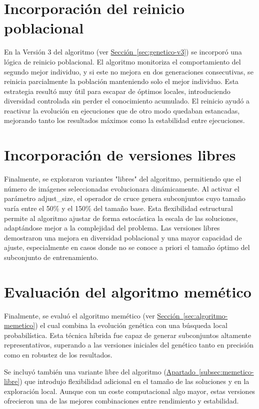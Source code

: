 \section{Incorporación del reinicio poblacional}\label{sec:incorporacion-reinicio-poblacional}
En la Versión 3 del algoritmo (ver \hyperref[sec:genetico-v3]{Sección~\ref*{sec:genetico-v3}}) se incorporó una lógica de reinicio poblacional.
El algoritmo monitoriza el comportamiento del segundo mejor individuo, y si este no mejora en dos generaciones consecutivas, se reinicia parcialmente la población manteniendo solo el mejor individuo.
Esta estrategia resultó muy útil para escapar de óptimos locales, introduciendo diversidad controlada sin perder el conocimiento acumulado.
El reinicio ayudó a reactivar la evolución en ejecuciones que de otro modo quedaban estancadas, mejorando tanto los resultados máximos como la estabilidad entre ejecuciones.

\section{Incorporación de versiones libres}\label{sec:incorporacion-versiones-libres}
Finalmente, se exploraron variantes "libres" del algoritmo, permitiendo que el número de imágenes seleccionadas evolucionara dinámicamente.
Al activar el parámetro adjust\_size, el operador de cruce genera subconjuntos cuyo tamaño varía entre el 50\% y el 150\% del tamaño base.
Esta flexibilidad estructural permite al algoritmo ajustar de forma estocástica la escala de las soluciones, adaptándose mejor a la complejidad del problema.
Las versiones libres demostraron una mejora en diversidad poblacional y una mayor capacidad de ajuste, especialmente en casos donde no se conoce a priori el tamaño óptimo del subconjunto de entrenamiento.

\section{Evaluación del algoritmo memético}\label{sec:evaluacion-algoritmo-memetico}
Finalmente, se evaluó el algoritmo memético (ver \hyperref[sec:algoritmo-memetico]{Sección~\ref*{sec:algoritmo-memetico}}) el cual combina la evolución genética con una búsqueda local probabilística.
Esta técnica híbrida fue capaz de generar subconjuntos altamente representativos, superando a las versiones iniciales del genético tanto en precisión como en robustez de los resultados.

Se incluyó también una variante libre del algoritmo (\hyperref[subsec:memetico-libre]{Apartado~\ref*{subsec:memetico-libre}}) que introdujo flexibilidad adicional en el tamaño de las soluciones y en la exploración local.
Aunque con un coste computacional algo mayor, estas versiones ofrecieron una de las mejores combinaciones entre rendimiento y estabilidad.

